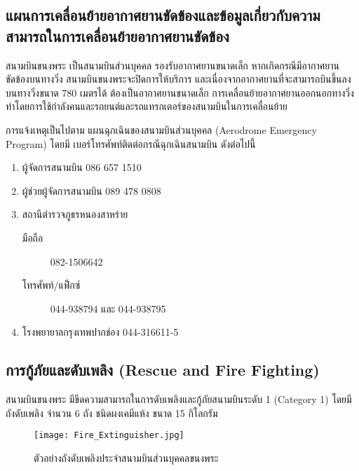 \subsection{แผนการเคลื่อนย้ายอากาศยานขัดข้องและข้อมูลเกี่ยวกับความสามารถในการเคลื่อนย้ายอากาศยานขัดข้อง}

สนามบินขนงพระ เป็นสนามบินส่วนบุคคล รองรับอากาศยานขนาดเล็ก หากเกิดกรณีมีอากาศยานขัดข้องบนทางวิ่ง สนามบินขนงพระจะปิดการให้บริการ และเนื่องจากอากาศยานที่จะสามารถบินขึ้นลง บนทางวิ่งขนาด 780 เมตรได้ ต้องเป็นอากาศยานขนาดเล็ก การเคลื่อนย้ายอากาศยานออกนอกทางวิ่งทำโดยการใช้กำลังคนและรถยนต์และรถแทรกเตอร์ของสนามบินในการเคลื่อนย้าย

การแจ้งเหตุเป็นไปตาม แผนฉุกเฉินของสนามบินส่วนบุคคล (Aerodrome Emergency Program) โดยมี เบอร์โทรศัพท์ติดต่อกรณีฉุกเฉินสนามบิน ดังต่อไปนี้

\begin{enumerate}
\item ผู้จัดการสนามบิน 086 657 1510
\item ผู้ช่วยผู้จัดการสนามบิน 089 478 0808
\item สถานีตำรวจภูธรหนองสาหร่าย
	\begin{description}
		\item[มือถือ] 082-1506642
		\item[โทรศัพท์/แฟ็กซ์] 044-938794 และ 044-938795
\end{description}
\item โรงพยายาลกรุงเทพปากช่อง 044-316611-5
\end{enumerate}

\subsection{การกู้ภัยและดับเพลิง (Rescue and Fire Fighting)}

สนามบินขนงพระ มีขีดความสามารถในการดับเพลิงและกู้ภัยสนามบินระดับ 1 (Category 1) โดยมี ถังดับเพลิง จำนวน 6 ถัง ชนิดผงเคมีแห้ง ขนาด 15 กิโลกรัม

\begin{figure}[h!]
\begin{center}
\texttt{[image: Fire\_Extinguisher.jpg]}
\caption{ตัวอย่างถังดับเพลิงประจำสนามบินส่วนบุคคลขนงพระ}
\label{ตัวอย่างถังดับเพลิงประจำสนามบินส่วนบุคคลขนงพระ}
\end{center}
\end{figure}
